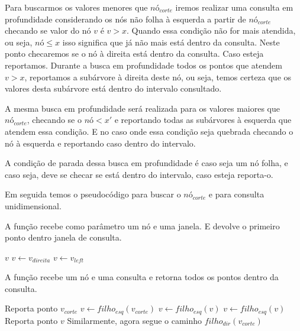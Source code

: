 Para buscarmos os valores menores que $nó_{corte}$ iremos realizar uma consulta em profundidade considerando
os nós não folha à esquerda a partir de $nó_{corte}$ checando se valor do nó $v$ é $v > x$. 
Quando essa condição não for mais atendida, ou seja, $nó \leq x$  isso significa que já não mais está
dentro da consulta. Neste ponto checaremos se o nó à direita está dentro da consulta. Caso esteja reportamos.
Durante a busca em profundidade todos os pontos que atendem $v > x$, reportamos a subárvore à direita
deste nó, ou seja, temos certeza que os valores desta subárvore está dentro do intervalo consultado.


A mesma busca em profundidade será realizada para os valores maiores que $nó_{corte}$, checando se 
o $nó < x'$ e reportando todas as subárvores à esquerda que atendem essa condição. E no caso onde essa
condição seja quebrada checando o nó à esquerda e reportando caso dentro do intervalo.

A condição de parada dessa busca em profundidade é caso seja um nó folha, e caso seja, deve se checar
se está dentro do intervalo, caso esteja reporta-o.

Em seguida temos o pseudocódigo para buscar o $nó_{corte}$ e para consulta unidimensional.

\begin{algorithm}
    \caption{A função  recebe como parâmetro um nó e uma 
    janela.
     E devolve o primeiro ponto dentro janela de consulta.}
    \begin{algorithmic}[1]
            \Return $v$
        \Else
                \State $v \leftarrow v_{direita}$ 
            \Else
                \State $v \leftarrow v_{left}$
            \EndIf
        \EndIf
    \EndFunction
    \end{algorithmic}
\end{algorithm}


\begin{algorithm}
    \caption{A função  recebe um nó e uma consulta e retorna todos
    os pontos dentro da consulta.}
    \begin{algorithmic}[1]
                \State Reporta ponto $v_{corte}$
            \EndIf
        \Else
            \State $v \leftarrow filho_{esq}(v_{corte})$
                    \State {}
                    \State $v \leftarrow filho_{esq}(v)$
                \Else
                    \State $v \leftarrow filho_{esq}(v)$
                \EndIf
            \EndWhile
                \State Reporta ponto $v$
            \EndIf
            \State Similarmente, agora segue o caminho $filho_{dir}(v_{corte})$
            
        \Endif
    \EndFunction
    \end{algorithmic}
\end{algorithm}
\clearpage


